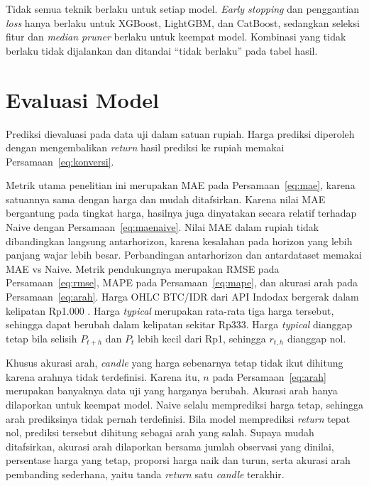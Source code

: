 Tidak semua teknik berlaku untuk setiap model. \textit{Early stopping} dan
penggantian \textit{loss} hanya berlaku untuk XGBoost, LightGBM, dan
CatBoost, sedangkan seleksi fitur dan \textit{median pruner} berlaku untuk
keempat model. Kombinasi yang tidak berlaku tidak dijalankan dan ditandai
``tidak berlaku'' pada tabel hasil.

\section{Evaluasi Model}
\label{sec:evaluasi}
Prediksi dievaluasi pada data uji dalam satuan rupiah. Harga prediksi diperoleh
dengan mengembalikan \textit{return} hasil prediksi ke rupiah memakai
Persamaan~\eqref{eq:konversi}.

Metrik utama penelitian ini merupakan MAE pada Persamaan~\eqref{eq:mae},
karena satuannya sama dengan harga dan mudah ditafsirkan. Karena nilai MAE
bergantung pada tingkat harga, hasilnya juga dinyatakan secara relatif
terhadap Naive dengan Persamaan~\eqref{eq:maenaive}.
Nilai MAE dalam rupiah tidak dibandingkan langsung antarhorizon, karena
kesalahan pada horizon yang lebih panjang wajar lebih besar. Perbandingan
antarhorizon dan antardataset memakai
MAE vs Naive. Metrik pendukungnya
merupakan RMSE pada Persamaan~\eqref{eq:rmse}, MAPE pada
Persamaan~\eqref{eq:mape}, dan akurasi arah pada Persamaan~\eqref{eq:arah}.
Harga OHLC BTC/IDR dari API Indodax bergerak dalam kelipatan Rp1.000
\cite{indodaxapi}. Harga \textit{typical} merupakan rata-rata tiga harga
tersebut, sehingga dapat berubah dalam kelipatan sekitar Rp333. Harga
\textit{typical} dianggap tetap bila selisih $P_{t+h}$ dan $P_t$ lebih kecil
dari Rp1, sehingga $r_{t,h}$ dianggap nol.

Khusus akurasi arah, \textit{candle} yang harga sebenarnya tetap tidak ikut dihitung
karena arahnya tidak terdefinisi. Karena itu, $n$ pada
Persamaan~\eqref{eq:arah} merupakan banyaknya data uji yang harganya berubah.
Akurasi arah hanya dilaporkan untuk keempat model. Naive selalu memprediksi
harga tetap, sehingga arah prediksinya tidak pernah terdefinisi. Bila model
memprediksi \textit{return} tepat nol, prediksi tersebut dihitung sebagai arah
yang salah. Supaya mudah ditafsirkan, akurasi arah dilaporkan bersama jumlah
observasi yang dinilai, persentase harga yang tetap, proporsi harga naik dan
turun, serta akurasi arah pembanding sederhana, yaitu tanda \textit{return}
satu \textit{candle} terakhir.

